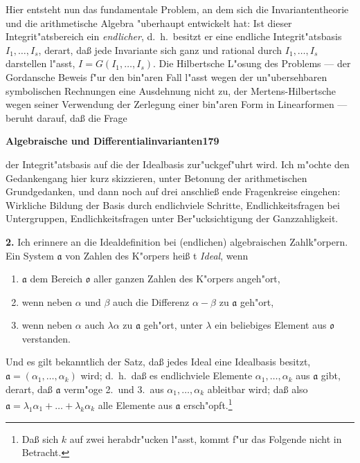 \documentclass[12pt,a4paper]{article}
\begin{document}
Hier entsteht nun das fundamentale Problem, an dem sich die Invariantentheorie
und die arithmetische Algebra "{u}berhaupt entwickelt
hat: Ist dieser Integrit"{a}tsbereich ein \textit{endlicher}, d.~h.~besitzt er eine endliche
Integrit"{a}tsbasis $I_{1},\dots,I_{s}$, derart, da{\ss} jede Invariante sich ganz und rational
durch $I_{1},\dots,I_{s}$ darstellen l"{a}sst, $I=G(I_{1},\dots,I_{s})$. Die Hilbertsche L"{o}sung
des Problems --- der Gordansche Beweis f"{u}r den bin"{a}ren Fall l"{a}sst wegen
der un"{u}bersehbaren symbolischen Rechnungen eine Ausdehnung nicht
zu, der Mertens-Hilbertsche wegen seiner Verwendung der Zerlegung
einer bin"{a}ren Form in Linearformen --- beruht darauf, da{\ss} die Frage

\newpage
\begin{center}
\textbf{Algebraische und Differentialinvarianten}\quad\textbf{179}
\end{center}

der Integrit"{a}tsbasis auf die der Idealbasis zur"{u}ckgef"{u}hrt wird. Ich m"{o}chte
den Gedankengang hier kurz skizzieren, unter Betonung der arithmetischen
Grundgedanken, und dann noch auf drei anschlie{\ss} ende Fragenkreise
eingehen: Wirkliche Bildung der Basis durch endlichviele Schritte,
Endlichkeitsfragen bei Untergruppen, Endlichkeitsfragen unter Ber"{u}cksichtigung
der Ganzzahligkeit.

\textbf{2.} Ich erinnere an die Idealdefinition bei (endlichen) algebraischen
Zahlk"{o}rpern. Ein System $\mathfrak{a}$ von Zahlen des K"{o}rpers hei{\ss} t \textit{Ideal}, wenn
\begin{enumerate}[label=\arabic*.]
    \item $\mathfrak{a}$ dem Bereich $\mathfrak{o}$ aller ganzen Zahlen des K"{o}rpers angeh"{o}rt,
    \item wenn neben $\alpha$ und $\beta$ auch die Differenz $\alpha-\beta$ zu $\mathfrak{a}$ geh"{o}rt,
    \item wenn neben $\alpha$ auch $\lambda\alpha$ zu $\mathfrak{a}$ geh"{o}rt, unter $\lambda$ ein beliebiges Element
    aus $\mathfrak{o}$ verstanden.
\end{enumerate}

Und es gilt bekanntlich der Satz, da{\ss} jedes Ideal eine Idealbasis besitzt,
$\mathfrak{a}=(\alpha_{1},\dots,\alpha_{k})$ wird; d.~h.~da{\ss} es endlichviele Elemente $\alpha_{1},\dots,\alpha_{k}$
aus $\mathfrak{a}$ gibt, derart, da{\ss} $\mathfrak{a}$ verm"{o}ge 2.\ und 3.\ aus $\alpha_{1},\dots,\alpha_{k}$ ableitbar
wird; da{\ss} also $\mathfrak{a}=\lambda_{1}\alpha_{1}+\dots+\lambda_{k}\alpha_{k}$ alle Elemente aus $\mathfrak{a}$ ersch"{o}pft.\footnote{Da{\ss} sich $k$ auf zwei herabdr"{u}cken l"{a}sst, kommt f"{u}r das Folgende nicht
in Betracht.}
\end{document}
